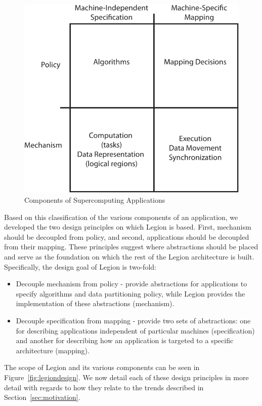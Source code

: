 \begin{figure}[ht]
\centering
\includegraphics[scale=0.7]{figs/designspace.pdf}
\caption{Components of Supercomputing Applications\label{fig:designspace}}
\end{figure}

Based on this classification of the various
components of an application, we developed
the two design principles on which Legion is
based.  First, mechanism should be decoupled
from policy, and second, applications should
be decoupled from their mapping. These principles
suggest where abstractions should be placed and
serve as the foundation on which the rest
of the Legion architecture is built. Specifically,
the design goal of Legion is two-fold:
\begin{itemize}
\item Decouple mechanism from policy - provide
      abstractions for applications to specify
      algorithms and data partitioning policy,
      while Legion provides the implementation
      of these abstractions (mechanism).
\item Decouple specification from mapping - 
      provide two sets of abstractions: one for
      describing applications independent of
      particular machines (specification)
      and another for describing how an application
      is targeted to a specific architecture (mapping).
\end{itemize}

The scope of Legion and its various 
components can be seen in Figure~\ref{fig:legiondesign}. 
We now detail each of these design principles 
in more detail with regards to how they relate 
to the trends described in Section~\ref{sec:motivation}.


